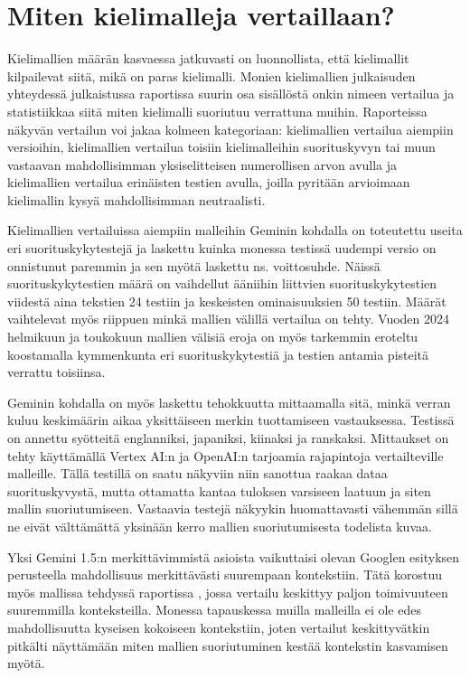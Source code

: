 \section{Miten kielimalleja vertaillaan?}

Kielimallien määrän kasvaessa jatkuvasti on luonnollista, että kielimallit
kilpailevat siitä, mikä on paras kielimalli. Monien kielimallien julkaisuden
yhteydessä julkaistussa raportissa suurin osa sisällöstä onkin nimeen vertailua
ja statistiikkaa siitä miten kielimalli suoriutuu verrattuna muihin.
Raporteissa näkyvän vertailun voi jakaa kolmeen kategoriaan: kielimallien
vertailua aiempiin versioihin, kielimallien vertailua toisiin kielimalleihin
suorituskyvyn tai muun vastaavan mahdollisimman yksiselitteisen numerollisen
arvon avulla ja kielimallien vertailua erinäisten testien avulla, joilla
pyritään arvioimaan kielimallin kysyä mahdollisimman neutraalisti.

Kielimallien vertailuissa aiempiin malleihin Geminin kohdalla on toteutettu
useita eri suorituskykytestejä ja laskettu kuinka monessa testissä uudempi
versio on onnistunut paremmin ja sen myötä laskettu ns. voittosuhde. Näissä
suorituskykytestien määrä on vaihdellut ääniihin liittvien suorituskykytestien
viidestä aina tekstien 24 testiin ja keskeisten ominaisuuksien 50 testiin.
Määrät vaihtelevat myös riippuen minkä mallien välillä vertailua on tehty.
Vuoden 2024 helmikuun ja toukokuun mallien välisiä eroja on myös tarkemmin
eroteltu koostamalla kymmenkunta eri suorituskykytestiä ja testien antamia
pisteitä verrattu toisiinsa. \parencite{googleDeepmindGeminiv1_5report}

Geminin kohdalla on myös laskettu tehokkuutta mittaamalla sitä, minkä verran
kuluu keskimäärin aikaa yksittäiseen merkin tuottamiseen vastauksessa. Testissä
on annettu syötteitä englanniksi, japaniksi, kiinaksi ja ranskaksi. Mittaukset
on tehty käyttämällä Vertex AI:n ja OpenAI:n tarjoamia rajapintoja vertailteville
malleille. \parencite{googleDeepmindGeminiv1_5report} Tällä testillä on saatu
näkyviin niin sanottua raakaa dataa suorituskyvystä, mutta ottamatta kantaa
tuloksen varsiseen laatuun ja siten mallin suoriutumiseen. Vastaavia testejä
näkyykin huomattavasti vähemmän sillä ne eivät välttämättä yksinään kerro
mallien suoriutumisesta todelista kuvaa.

Yksi Gemini 1.5:n merkittävimmistä asioista vaikuttaisi olevan Googlen
esityksen \parencite{googleKeynote2024} perusteella mahdollisuus merkittävästi
suurempaan kontekstiin. Tätä korostuu myös mallissa tehdyssä raportissa
\parencite{googleDeepmindGeminiv1_5report}, jossa vertailu keskittyy paljon
toimivuuteen suuremmilla konteksteilla. Monessa tapauskessa muilla malleilla ei
ole edes mahdollisuutta kyseisen kokoiseen kontekstiin, joten vertailut
keskittyvätkin pitkälti näyttämään miten mallien suoriutuminen kestää
kontekstin kasvamisen myötä.

